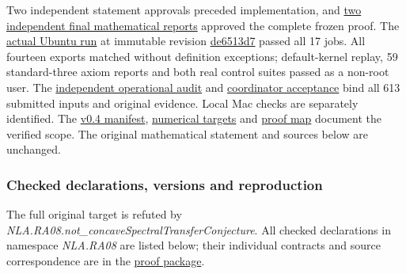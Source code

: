 \documentclass[11pt,a4paper]{article}
\begin{document}
Two independent statement approvals preceded implementation, and
\href{https://github.com/ajt60gaibb/OpenProblemsInNLA/blob/main/randomized-and-low-rank-approximation/RA-08/lean/README.md\#review-and-checks-actually-performed}{two
independent final mathematical reports} approved the complete frozen
proof. The
\href{https://github.com/sgstepaniants/OpenProblemsInNLA/actions/runs/34735273999}{actual
Ubuntu run} at immutable revision
\href{https://github.com/sgstepaniants/OpenProblemsInNLA/tree/de6513d726e3f66d20730fdaef5ba99318ee7e8b/randomized-and-low-rank-approximation/RA-08/lean}{de6513d7}
passed all 17 jobs. All fourteen exports matched without definition
exceptions; default-kernel replay, 59 standard-three axiom reports and
both real control suites passed as a non-root user. The
\href{https://github.com/ajt60gaibb/OpenProblemsInNLA/blob/main/randomized-and-low-rank-approximation/RA-08/lean/verification/linux-2026-09-12/OPERATIONAL-REVIEW.md}{independent
operational audit} and
\href{https://github.com/ajt60gaibb/OpenProblemsInNLA/blob/main/randomized-and-low-rank-approximation/RA-08/lean/verification/root-operational-2026-09-12/ROOT-CHECKS.json}{coordinator
acceptance} bind all 613 submitted inputs and original evidence. Local
Mac checks are separately identified. The
\href{https://github.com/ajt60gaibb/OpenProblemsInNLA/blob/main/randomized-and-low-rank-approximation/RA-08/lean/formalization.yaml}{v0.4
manifest},
\href{https://github.com/ajt60gaibb/OpenProblemsInNLA/blob/main/randomized-and-low-rank-approximation/RA-08/lean/NUMERICAL_TARGETS.md}{numerical
targets} and
\href{https://github.com/ajt60gaibb/OpenProblemsInNLA/blob/main/randomized-and-low-rank-approximation/RA-08/lean/PROOF_MAP.md}{proof
map} document the verified scope. The original mathematical statement
and sources below are unchanged.

\subsubsection{Checked declarations, versions and
reproduction}\label{checked-declarations-versions-and-reproduction}

The full original target is refuted by
\textit{NLA.RA08.not\_concaveSpectralTransferConjecture}. All checked
declarations in namespace \textit{NLA.RA08} are listed below; their
individual contracts and source correspondence are in the
\href{https://github.com/ajt60gaibb/OpenProblemsInNLA/blob/main/randomized-and-low-rank-approximation/RA-08/lean/README.md}{proof
package}.
\end{document}
